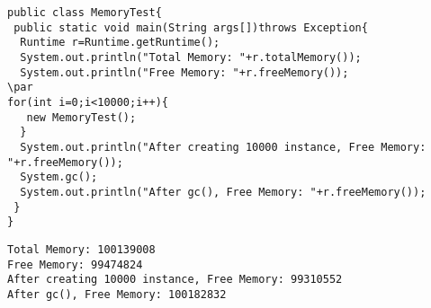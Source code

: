 \documentclass{book}
\def\lthtmlcheckvsize{\ifdim\ht\sizebox<\vsize 
  \ifdim\wd\sizebox<\hsize\expandafter\hfill\fi \expandafter\vfill
  \else\expandafter\vss\fi}%
\begin{document}
{\newpage\clearpage
{}%
\begin{lstlisting}
public class MemoryTest{  
 public static void main(String args[])throws Exception{  
  Runtime r=Runtime.getRuntime();  
  System.out.println("Total Memory: "+r.totalMemory());  
  System.out.println("Free Memory: "+r.freeMemory());  
\par
for(int i=0;i<10000;i++){  
   new MemoryTest();  
  }  
  System.out.println("After creating 10000 instance, Free Memory: "+r.freeMemory());  
  System.gc();  
  System.out.println("After gc(), Free Memory: "+r.freeMemory());  
 }  
}  
\end{lstlisting}%
\lthtmlfigureZ
\lthtmlcheckvsize\clearpage}

{\newpage\clearpage
{}%
\begin{lstlisting}
Total Memory: 100139008
Free Memory: 99474824
After creating 10000 instance, Free Memory: 99310552
After gc(), Free Memory: 100182832
\end{lstlisting}%
\lthtmlfigureZ
\lthtmlcheckvsize\clearpage}
\end{document}
